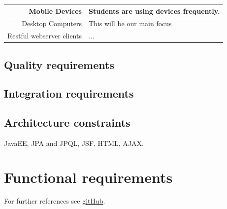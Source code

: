 \documentclass[a4paper,12pt]{report}
\begin{document}
\begin{tabular}{|r|l|}
\hline
Mobile Devices & Students are using devices frequently. \\
\hline
Desktop Computers &  This will be our main focus\\
\hline
Restful webserver clients & ... \\
\hline
\end{tabular}

\subsection{Quality requirements}
\subsection{Integration requirements}
\subsection{Architecture constraints}
JavaEE, JPA and JPQL, JSF, HTML,
AJAX.
\section{Functional requirements}
For further references see \href{http://www.sharelatex.com}{gitHub}.
\end{document}
